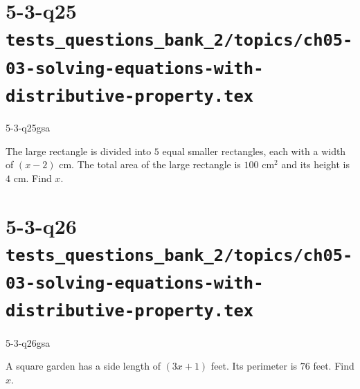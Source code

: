 \documentclass[12pt, fleqn, openany]{studyGuide}
\begin{document}
\newpage
\section*{5-3-q25 \hfill \normalsize\texttt{tests\_questions\_bank\_2/topics/ch05-03-solving-equations-with-distributive-property.tex}}
\begin{practiceQuestion}{5-3-q25}{gsa}
\begin{questionText}
The large rectangle is divided into $5$ equal smaller rectangles, each with a width of $(x - 2)$ cm. The total area of the large rectangle is $100$ cm$^{2}$ and its height is $4$ cm. Find $x$.

\begin{center}
\end{center}
\end{questionText}
\end{practiceQuestion}

\newpage
\section*{5-3-q26 \hfill \normalsize\texttt{tests\_questions\_bank\_2/topics/ch05-03-solving-equations-with-distributive-property.tex}}
\begin{practiceQuestion}{5-3-q26}{gsa}
\begin{questionText}
A square garden has a side length of $(3x + 1)$ feet. Its perimeter is $76$ feet. Find $x$.

\begin{center}
\end{center}
\end{questionText}
\end{practiceQuestion}
\end{document}

